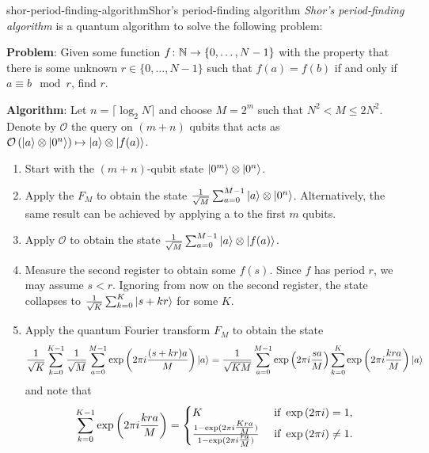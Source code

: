 \begin{topic}{shor-period-finding-algorithm}{Shor's period-finding algorithm}
    \emph{Shor's period-finding algorithm} is a quantum algorithm to solve the following problem:

    \textbf{Problem}: Given some function $f \colon \mathbb{N} \to \{ 0, \ldots, N - 1 \}$ with the property that there is some unknown $r \in \{ 0, \ldots, N - 1 \}$ such that $f(a) = f(b)$ if and only if $a \equiv b \mod r$, find $r$.

    \textbf{Algorithm}: Let $n = \lceil \log_2 N \rceil$ and choose $M = 2^m$ such that $N^2 < M \le 2 N^2$. Denote by $\mathcal{O}$ the query on $(m + n)$ qubits that acts as $\mathcal{O} \left( |a\rangle \otimes |0^n\rangle \right) \mapsto |a\rangle \otimes |f(a)\rangle$.
    \begin{enumerate}[label=(\arabic*)]
        \item Start with the $(m + n)$-qubit state $|0^m\rangle \otimes |0^n\rangle$.
        \item Apply the  $F_M$ to obtain the state $\frac{1}{\sqrt{M}} \sum_{a = 0}^{M - 1} |a\rangle \otimes |0^n\rangle$. Alternatively, the same result can be achieved by applying a  to the first $m$ qubits.
        \item Apply $\mathcal{O}$ to obtain the state $\frac{1}{\sqrt{M}} \sum_{a = 0}^{M - 1} |a\rangle \otimes |f(a)\rangle$.
        \item Measure the second register to obtain some $f(s)$. Since $f$ has period $r$, we may assume $s < r$. Ignoring from now on the second register, the state collapses to $\frac{1}{\sqrt{K}} \sum_{k = 0}^{K} |s + kr\rangle$ for some $K$.
        \item Apply the quantum Fourier transform $F_M$ to obtain the state
        \[ \frac{1}{\sqrt{K}} \sum_{k = 0}^{K - 1} \frac{1}{\sqrt{M}} \sum_{a = 0}^{M - 1} \exp \left( 2 \pi i \frac{(s + kr) a}{M} \right) |a\rangle = \frac{1}{\sqrt{K M}} \sum_{a = 0}^{M - 1} \exp \left( 2 \pi i \frac{s a}{M} \right) \sum_{k = 0}^{K} \exp \left( 2 \pi i \frac{k r a}{M} \right) |a\rangle \]
        and note that
        \[ \sum_{k = 0}^{K - 1} \exp \left( 2 \pi i \frac{k r a}{M} \right) = \begin{cases}
            K & \textup{ if } \exp \left( 2 \pi i \right) = 1 , \\
            \frac{1 - \exp(2 \pi i \tfrac{K r a}{M})}{1 - \exp(2 \pi i \tfrac{r a}{M})} & \textup{ if } \exp \left( 2 \pi i \right) \ne 1 . \\

\end{cases}\]
\end{enumerate}
\end{topic}
